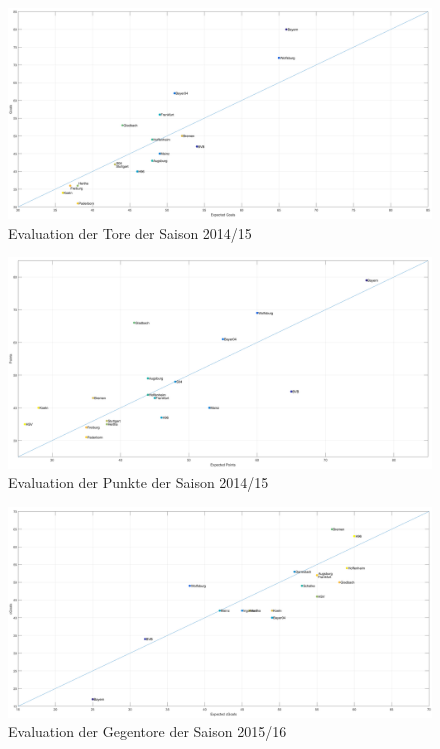 \begin{figure}
\centering
\includegraphics[scale=0.3]{se-wa-jpg/goals_correlation_14_15}
\caption{Evaluation der Tore der Saison 2014/15}
\label{g1415}
\end{figure}

\begin{figure}
\centering
\includegraphics[scale=0.3]{se-wa-jpg/points_correlation_14_15}
\caption{Evaluation der Punkte der Saison 2014/15}
\label{p1415}
\end{figure}

\begin{figure}
\centering
\includegraphics[scale=0.3]{se-wa-jpg/cGoals_correlation_15_16}
\caption{Evaluation der Gegentore der Saison 2015/16}
\label{lines}
\end{figure}

